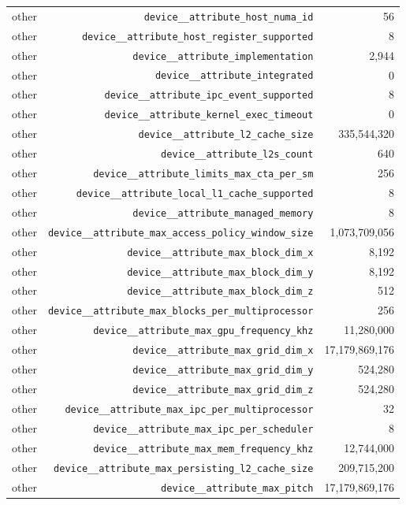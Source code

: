 \begin{table}[h]
\begin{tabular}{|l|r|r|}
other & \texttt{device__attribute_host_numa_id} & 56 \\
other & \texttt{device__attribute_host_register_supported} & 8 \\
other & \texttt{device__attribute_implementation} & 2,944 \\
other & \texttt{device__attribute_integrated} & 0 \\
other & \texttt{device__attribute_ipc_event_supported} & 8 \\
other & \texttt{device__attribute_kernel_exec_timeout} & 0 \\
other & \texttt{device__attribute_l2_cache_size} & 335,544,320 \\
other & \texttt{device__attribute_l2s_count} & 640 \\
other & \texttt{device__attribute_limits_max_cta_per_sm} & 256 \\
other & \texttt{device__attribute_local_l1_cache_supported} & 8 \\
other & \texttt{device__attribute_managed_memory} & 8 \\
other & \texttt{device__attribute_max_access_policy_window_size} & 1,073,709,056 \\
other & \texttt{device__attribute_max_block_dim_x} & 8,192 \\
other & \texttt{device__attribute_max_block_dim_y} & 8,192 \\
other & \texttt{device__attribute_max_block_dim_z} & 512 \\
other & \texttt{device__attribute_max_blocks_per_multiprocessor} & 256 \\
other & \texttt{device__attribute_max_gpu_frequency_khz} & 11,280,000 \\
other & \texttt{device__attribute_max_grid_dim_x} & 17,179,869,176 \\
other & \texttt{device__attribute_max_grid_dim_y} & 524,280 \\
other & \texttt{device__attribute_max_grid_dim_z} & 524,280 \\
other & \texttt{device__attribute_max_ipc_per_multiprocessor} & 32 \\
other & \texttt{device__attribute_max_ipc_per_scheduler} & 8 \\
other & \texttt{device__attribute_max_mem_frequency_khz} & 12,744,000 \\
other & \texttt{device__attribute_max_persisting_l2_cache_size} & 209,715,200 \\
other & \texttt{device__attribute_max_pitch} & 17,179,869,176 \\

\end{tabular}
\end{table}
